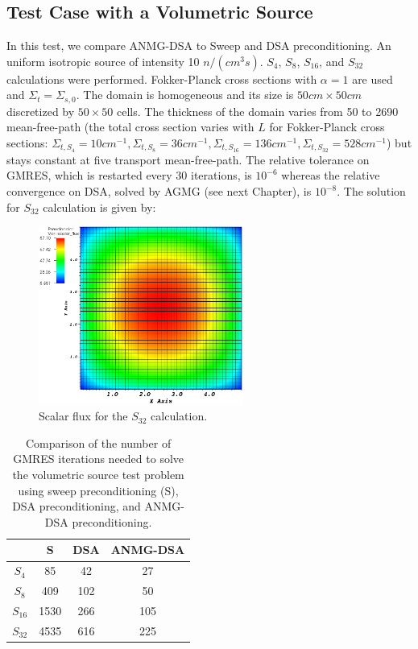 \subsection{Test Case with a Volumetric Source}
In this test, we compare ANMG-DSA to Sweep and DSA preconditioning. An uniform
isotropic source of intensity 10 $n/(cm^3 s)$. $S_4$, $S_8$, $S_{16}$, and
$S_{32}$ calculations were performed. Fokker-Planck cross sections with
$\alpha=1$ are used and $\Sigma_t = \Sigma_{s,0}$. The domain is homogeneous
and its size is $50cm \times 50cm$ discretized by $50\times 50$ cells. The 
thickness of the domain varies from 50 to 2690 mean-free-path (the total cross 
section varies with $L$ for Fokker-Planck cross sections: $\Sigma_{t,S_4}=10cm^{-1},
\Sigma_{t,S_8}=36cm^{-1}, \Sigma_{t,S_{16}}=136cm^{-1}, 
\Sigma_{t,S_{32}}=528cm^{-1}$) but stays constant at five transport
mean-free-path. The relative tolerance on GMRES, which is restarted every 30
iterations, is $10^{-6}$ whereas the
relative convergence on DSA, solved by AGMG (see next Chapter), is $10^{-8}$.
The solution for $S_{32}$ calculation is given by:
\begin{figure}[H]
  \centering
  \includegraphics[width=0.6\textwidth]{Anmg/homog_anmg_crop}
  \caption{Scalar flux for the $S_{32}$ calculation.}
\end{figure}
\begin{table}[H]
  \begin{center}
    \caption{Comparison of the number of GMRES iterations needed to solve the 
      volumetric source test problem using sweep preconditioning (S), DSA 
    preconditioning, and ANMG-DSA preconditioning.}
    \begin{tabular}{|c|c|c|c|}
      \hline
      & S & DSA & ANMG-DSA \\
      \hline
      $S_4$ & 85   & 42  & 27  \\
      $S_8$ & 409  & 102 & 50  \\
   $S_{16}$ & 1530 & 266 & 105 \\
   $S_{32}$ & 4535 & 616 & 225 \\
      \hline
    \end{tabular}
    \label{table_gmres_homog}
  \end{center}
\end{table}
